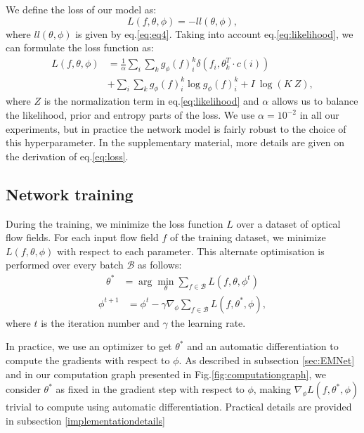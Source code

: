 \documentclass[10pt,twocolumn,letterpaper]{article}
\begin{document}
We define the loss of our model as:
\begin{equation}
L(f, \theta, \phi) = - ll(\theta, \phi),
\end{equation}
where $ll(\theta, \phi)$ is given by eq.\eqref{eq:eq4}. Taking into account eq.\eqref{eq:likelihood}, we can formulate the loss function as: 
\begin{align}\label{eq:loss}
L(f, \theta, \phi) &= \frac{1}{\alpha}\sum_i \sum_k  g_\phi(f)_i^k  \delta(f_i, \theta_k^T \cdot c(i)) \nonumber \\ &+ \sum_i \sum_k  g_\phi(f)_i^k \log g_\phi(f)_i^k + I\  \log(K \ Z),
\end{align}
where {\color{black} $Z$ is the normalization term in eq.\eqref{eq:likelihood} and} $\alpha$ allows us to balance the likelihood, prior and entropy parts of the loss.
We use $\alpha=10^{-2}$ in all our experiments, but in practice the network model is fairly robust to the choice of this hyperparameter. {\color{black}In the supplementary material, more details are given on the derivation of eq.\eqref{eq:loss}.} 

\subsection{Network training}
\label{training}

During the training, we minimize the loss function $L$ over a dataset of optical flow fields. For each input flow field $f$ of the training dataset, we minimize $L(f, \theta, \phi)$ with respect to each parameter. This alternate optimisation is performed over every batch $\mathcal{B}$ as follows: 
\begin{align}\label{eq:theta_optimal}
\theta^* &= \arg \min_{\theta} \sum_{f \in  \mathcal{B}} L(f, \theta, \phi^{t})
\end{align}
\begin{align}\label{eq:phi_optimal}
\phi^{t+1} &= \phi^t - \gamma \nabla_{\phi}  \sum_{f \in  \mathcal{B}} L(f, \theta^*, \phi),
\end{align}
where $t$ is the iteration number and $\gamma$ the learning rate. 


In practice, we use an optimizer to get $\theta^*$ and an automatic differentiation to compute the gradients with respect to $\phi$. As described in subsection \ref{sec:EMNet} and in our computation graph presented in Fig.\ref{fig:computationgraph}, we consider $\theta^*$ as fixed in the gradient step with respect to $\phi$, making $\nabla_{\phi} L(f, \theta^*, \phi)$ trivial to compute using automatic differentiation. Practical details are provided in subsection \ref{implementationdetails} 
\end{document}

